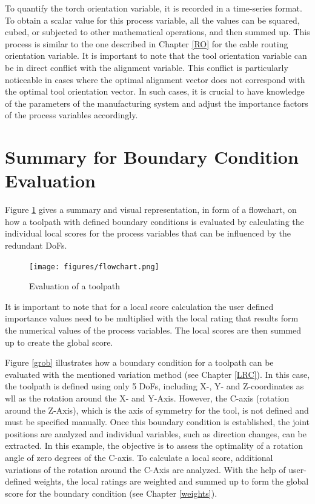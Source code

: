 To quantify the torch orientation variable, it is recorded in a time-series format. To obtain a scalar value for this process variable, all the values can be squared, cubed, or subjected to other mathematical operations, and then summed up. This process is similar to the one described in Chapter \ref{RO} for the cable routing orientation variable. It is important to note that the tool orientation variable can be in direct conflict with the alignment variable. This conflict is particularly noticeable in cases where the optimal alignment vector does not correspond with the optimal tool orientation vector. In such cases, it is crucial to have knowledge of the parameters of the manufacturing system and adjust the importance factors of the process variables accordingly. 


\newpage
\section{Summary for Boundary Condition Evaluation}
Figure \ref{allflow} gives a summary and visual representation, in form of a flowchart, on how a toolpath with defined boundary conditions is evaluated by calculating the individual local scores for the process variables that can be influenced by the redundant \acrshort{DoF}s.

\begin{figure}[H]
	\centerline{\texttt{[image: figures/flowchart.png]}}
	\caption{Evaluation of a toolpath}
	\label{allflow}
\end{figure}


It is important to note that for a local score calculation the user defined importance values need to be multiplied with the local rating that results form the numerical values of the process variables. The local scores are then summed up to create the global score.

Figure \ref{grob} illustrates how a boundary condition for a toolpath can be evaluated with the mentioned variation method (see Chapter \ref{LRC}). In this case, the toolpath is defined using only 5 \acrshort{DoF}s, including X-, Y- and Z-coordinates as wll as the rotation around the X- and Y-Axis. However, the C-axis (rotation around the Z-Axis), which is the axis of symmetry for the tool, is not defined and must be specified manually. Once this boundary condition is established, the joint positions are analyzed and individual variables, such as direction changes, can be extracted. In this example, the objective is to assess the optimality of a rotation angle of zero degrees of the C-axis. To calculate a local score, additional variations of the rotation around the C-Axis are analyzed. With the help of user-defined weights, the local ratings are weighted and summed up to form the global score for the boundary condition (see Chapter \ref{weights}).\newline


